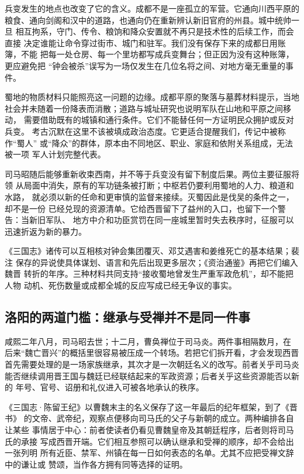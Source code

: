 兵变发生的地点也改变了它的含义。成都不是一座孤立的军营。它通向川西平原的
粮食、通向剑阁和汉中的道路，也通向仍在重新辨认新旧官府的州县。城中统帅一旦
相互拘系，守门、传令、粮饷和降众安置就不再只是技术性的后续工作，而会直接
决定谁能让命令穿过街市、城门和驻军。我们没有保存下来的成都日用账簿，不能
把每一处仓房、每一个里坊都写成兵变舞台；但正因为没有这种账簿，更应避免把
“钟会被杀”误写为一场仅发生在几位名将之间、对地方毫无重量的事件。

蜀地的物质材料只能照亮这一问题的边缘。成都平原的聚落与墓葬材料提示，当地
社会并未随着一份降表而消散；道路与城址研究也说明军队在山地和平原之间移动，
需要借助既有的城镇和通行条件。它们不能替任何一方证明民众拥护或反对兵变。
考古沉默在这里不该被填成政治态度。它更适合提醒我们，传记中被称作“蜀人”
或“降众”的群体，原本由不同地区、职业、家庭和依附关系组成，无法被一项
军人计划完整代表。

司马昭随后能够重新收束西南，并不等于兵变没有留下制度后果。两位主要征服将领
从局面中消失，原有的军功链条被打断；中枢若仍要利用蜀地的人力、粮道和水路，
就必须以新的任命和更审慎的监督来接续。灭蜀因此是伐吴的条件之一，却不是一份
已经兑现的资源清单。它给西晋留下了益州的入口，也留下一个警告：当新旧军队、
地方中介和功臣赏罚在同一座城里暂时失去秩序时，征服可以迅速折返为新的暴力。

\begin{sourcenote}[二六四年的叙事为何必须留下接缝]
《三国志》诸传可以互相核对钟会集团覆灭、邓艾遇害和姜维死亡的基本结果；裴注
保存的异说使具体谋划、语言和先后出现更多层次；《资治通鉴》再把它们编入魏晋
转折的年序。三种材料共同支持“接收蜀地曾发生严重军政危机”，却不能把人物
动机、死伤数量或成都全城的反应写成已经无争议的事实。
\end{sourcenote}

\subsection{洛阳的两道门槛：继承与受禅并不是同一件事}

咸熙二年八月，司马昭去世；十二月，曹奂禅位于司马炎。两件事相隔数月，在
后来“魏亡晋兴”的概括里很容易被压成一个转场。若把它们拆开看，才会发现西晋
首先需要处理的是一场家族继承，其次才是一次朝廷名义的改写。前者关乎司马炎
能否继续调用晋王国与魏廷已经联结起来的军政资源；后者关乎这些资源能否以新的
年号、官号、诏册和礼仪进入可被各地承认的秩序。

《三国志·陈留王纪》以曹魏末主的名义保存了这一年最后的纪年框架，到了《晋书》
的文帝、武帝纪，观察点便移向司马氏的父子与新朝的成立。两种编排各自让某些
事情居于中心：前者使读者仍看见曹魏皇帝及其朝廷程序，后者则将司马氏的承接
写成西晋开端。它们相互参照可以确认继承和受禅的顺序，却不会给出一张列明
所有近臣、禁军、州镇在每一日如何表态的名单。尤其不应把受禅文辞中的谦让或
赞颂，当作各方拥有同等选择的证明。

